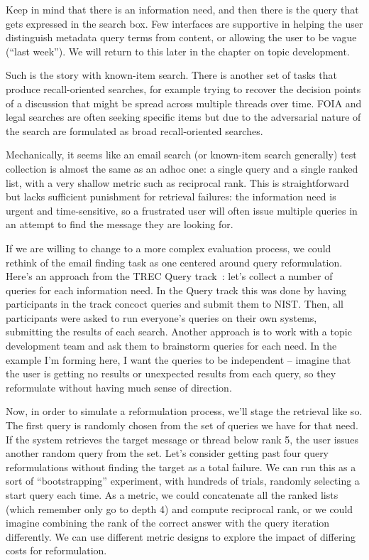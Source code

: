 \documentclass[nobib]{tufte-book}
\begin{document}
Keep in mind that there is an information need, and then there is the query that gets expressed in the search box.  Few interfaces are supportive in helping the user distinguish metadata query terms from content, or allowing the user to be vague (``last week'').  We will return to this later in the chapter on topic development.

Such is the story with known-item search.  There is another set of tasks that produce recall-oriented searches, for example trying to recover the decision points of a discussion that might be spread across multiple threads over time.  FOIA and legal searches are often seeking specific items but due to the adversarial nature of the search are formulated as broad recall-oriented searches.

Mechanically, it seems like an email search (or known-item search generally) test collection is almost the same as an adhoc one: a single query and a single ranked list, with a very shallow metric such as reciprocal rank.  This is straightforward but lacks sufficient punishment for retrieval failures: the information need is urgent and time-sensitive, so a frustrated user will often issue multiple queries in an attempt to find the message they are looking for.

If we are willing to change to a more complex evaluation process, we could rethink of the email finding task as one centered around query reformulation.  Here's an approach from the TREC Query track~\autocite{buckley_query_track_trec9}: let's collect a number of queries for each information need.  In the Query track this was done by having participants in the track concoct queries and submit them to NIST.  Then, all participants were asked to run everyone's queries on their own systems, submitting the results of each search. Another approach is to work with a topic development team and ask them to brainstorm queries for each need.  In the example I'm forming here, I want the queries to be independent -- imagine that the user is getting no results or unexpected results from each query, so they reformulate without having much sense of direction.

Now, in order to simulate a reformulation process, we'll stage the retrieval like so.  The first query is randomly chosen from the set of queries we have for that need.  If the system retrieves the target message or thread below rank 5, the user issues another random query from the set.  Let's consider getting past four query reformulations without finding the target as a total failure.  We can run this as a sort of ``bootstrapping'' experiment, with hundreds of trials, randomly selecting a start query each time.  As a metric, we could concatenate all the ranked lists (which remember only go to depth 4) and compute reciprocal rank, or we could imagine combining the rank of the correct answer with the query iteration differently.  We can use different metric designs to explore the impact of differing costs for reformulation.
\end{document}
